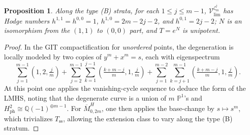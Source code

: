 \documentclass[12pt,letterpaper,english]{amsart}
\numberwithin{equation}{section}
\numberwithin{figure}{section}
\theoremstyle{plain}
\theoremstyle{remark}
\theoremstyle{definition}
\theoremstyle{definition}
\theoremstyle{plain}
\theoremstyle{plain}
\newtheorem{prop}[equation]{Proposition}
\theoremstyle{plain}
\theoremstyle{plain}
\theoremstyle{definition}
\def\QQ{\mathbb{Q}}
\def\PP{\mathbb{P}}
\def\V{\mathcal{V}}
\theoremstyle{definition}
\begin{document}
\begin{prop}\label{D6}
Along the type \textup{(}B\textup{)} strata, for each $1\leq j\leq m-1$, $\V^{\zeta_m^j}_{\lim}$ has Hodge numbers $h^{1,1}=h^{0,0}=1$, $h^{1,0}=2m-2j-2$, and $h^{0,1}=2j-2$; $N$ is an isomorphism from the $(1,1)$ to $(0,0)$ part, and $T=e^N$ is unipotent.
\end{prop}
\begin{proof}
In the GIT compactification for \emph{unordered} points, the degeneration is locally modeled by two copies of $y^m+x^m=s$, each with eigenspectrum
$$\textstyle\sum_{j=1}^{m-1}(1,2,\tfrac{j}{m})+\sum_{j=2}^{m-1}\sum_{k=1}^{j-1}(\tfrac{k+m-j}{m},1,\tfrac{j}{m})+\sum_{j=1}^{m-2}\sum_{k=j+1}^{m-1}(\tfrac{k+m-j}{m},1,\tfrac{j}{m}).$$
At this point one applies the vanishing-cycle sequence to deduce the form of the LMHS, noting that the degenerate curve is a union of $m$ $\PP^1$'s and $H^2_{\text{ph}}\cong \QQ(-1)^{\oplus m-1}$. For $\overline{M}^H_{0,2m}$, one then applies the base-change by $s\mapsto s^m$, which trivializes $T_{\text{ss}}$, allowing the extension class to vary along the type (B) stratum.
\end{proof}
\end{document}
